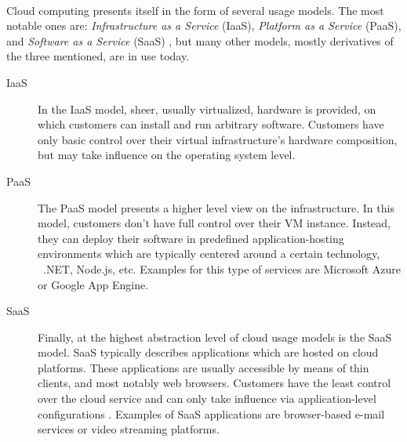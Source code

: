 \paragraph{}
Cloud computing presents itself in the form of several usage models. The most notable ones are: \emph{Infrastructure as a Service} (IaaS),  \emph{Platform as a Service} (PaaS), and \emph{Software as a Service} (SaaS) \cite{mell2011nist}, but many other models, mostly derivatives of the three mentioned, are in use today.

\begin{description}
\item[IaaS] In the IaaS model, sheer, usually virtualized, hardware is provided, on which customers can install and run arbitrary software. Customers have only basic control over their virtual infrastructure's hardware composition, but may take influence on the operating system level.
\item[PaaS] The PaaS model presents a higher level view on the infrastructure. In this model, customers don't have full control over their VM instance. Instead, they can deploy their software in predefined application-hosting environments \cite{mell2011nist} which are typically centered around a certain technology, \eg\ .NET, Node.js, etc. Examples for this type of services are Microsoft Azure or Google App Engine.
\item[SaaS] Finally, at the highest abstraction level of cloud usage models is the SaaS model. SaaS typically describes applications which are hosted on cloud platforms. These applications are usually accessible by means of thin clients, and most notably web browsers. Customers have the least control over the cloud service and can only take influence via application-level configurations \cite{mell2011nist}. Examples of SaaS applications are browser-based e-mail services or video streaming platforms.
\end{description}








%
%
%
%
%
%
%
%
%
%



